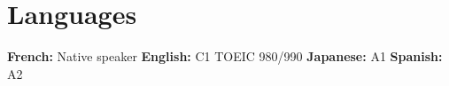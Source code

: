 \documentclass[a4paper,10pt]{article}
\begin{document}
\section{Languages}
\begin{itemize}[leftmargin=0in, label={}]
    \small{\item{
        \textbf{French:} Native speaker \hspace{8pt}
        \textbf{English:} C1 \textemdash{} TOEIC 980/990 \hspace{8pt}
        \textbf{Japanese:} A1 \hspace{8pt}
        \textbf{Spanish:} A2
    }}
\end{itemize}

\end{document}

